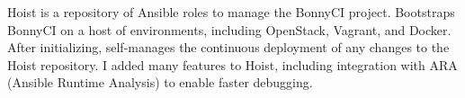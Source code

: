 {
  Hoist is a repository of Ansible roles to manage the BonnyCI project. Bootstraps BonnyCI on a host of environments, including OpenStack, Vagrant, and Docker. After initializing, self-manages the continuous deployment of any changes to the Hoist repository. I added many features to Hoist, including integration with ARA (Ansible Runtime Analysis) to enable faster debugging.}
